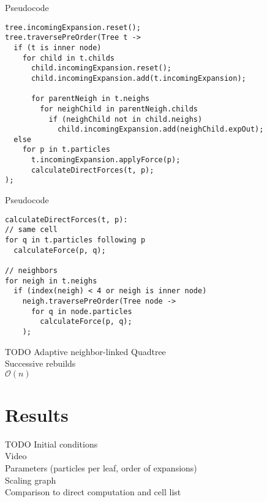 \begin{frame}[fragile]{Pseudocode}
  \begin{lstlisting}[caption = Downward Pass]
tree.incomingExpansion.reset();
tree.traversePreOrder(Tree t ->
  if (t is inner node)
    for child in t.childs
      child.incomingExpansion.reset();
      child.incomingExpansion.add(t.incomingExpansion);

      for parentNeigh in t.neighs
        for neighChild in parentNeigh.childs
          if (neighChild not in child.neighs)
            child.incomingExpansion.add(neighChild.expOut);
  else
    for p in t.particles
      t.incomingExpansion.applyForce(p);
      calculateDirectForces(t, p);
);
  \end{lstlisting}
\end{frame}

\begin{frame}[fragile]{Pseudocode}
  \begin{lstlisting}[caption = Calculation of Direct Forces]
calculateDirectForces(t, p):
// same cell
for q in t.particles following p
  calculateForce(p, q);

// neighbors
for neigh in t.neighs
  if (index(neigh) < 4 or neigh is inner node)
    neigh.traversePreOrder(Tree node ->
      for q in node.particles
        calculateForce(p, q);
    );
  \end{lstlisting}
\end{frame}

\begin{frame}{TODO}
  Adaptive neighbor-linked Quadtree \\
  Successive rebuilds \\
  $\mathcal O(n)$
\end{frame}

\section{Results}

\begin{frame}{TODO}
  Initial conditions \\
  Video \\
  Parameters (particles per leaf, order of expansions) \\
  Scaling graph \\
  Comparison to direct computation and cell list
\end{frame}

